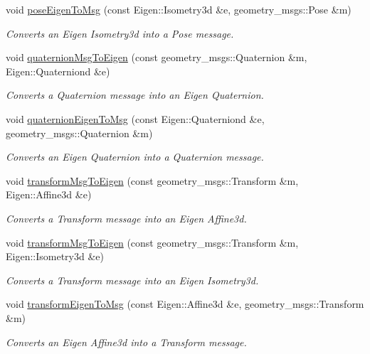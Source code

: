 \begin{DoxyCompactItemize}
void \hyperlink{namespacetf_adda234955557076bd46804dec234396d}{pose\-Eigen\-To\-Msg} (const Eigen\-::\-Isometry3d \&e, geometry\-\_\-msgs\-::\-Pose \&m)
\begin{DoxyCompactList}\small\item\em Converts an Eigen Isometry3d into a Pose message. \end{DoxyCompactList}\item 
void \hyperlink{namespacetf_ab7fd3888706bdcc976acffecdf9886be}{quaternion\-Msg\-To\-Eigen} (const geometry\-\_\-msgs\-::\-Quaternion \&m, Eigen\-::\-Quaterniond \&e)
\begin{DoxyCompactList}\small\item\em Converts a Quaternion message into an Eigen Quaternion. \end{DoxyCompactList}\item 
void \hyperlink{namespacetf_a9029fb8e50866ee1c690bbc6729d33b2}{quaternion\-Eigen\-To\-Msg} (const Eigen\-::\-Quaterniond \&e, geometry\-\_\-msgs\-::\-Quaternion \&m)
\begin{DoxyCompactList}\small\item\em Converts an Eigen Quaternion into a Quaternion message. \end{DoxyCompactList}\item 
void \hyperlink{namespacetf_a4323ed345fb25c89de3a297fdc7401a4}{transform\-Msg\-To\-Eigen} (const geometry\-\_\-msgs\-::\-Transform \&m, Eigen\-::\-Affine3d \&e)
\begin{DoxyCompactList}\small\item\em Converts a Transform message into an Eigen Affine3d. \end{DoxyCompactList}\item 
void \hyperlink{namespacetf_a2f3ebfd509762829be66fc0165bfd0e5}{transform\-Msg\-To\-Eigen} (const geometry\-\_\-msgs\-::\-Transform \&m, Eigen\-::\-Isometry3d \&e)
\begin{DoxyCompactList}\small\item\em Converts a Transform message into an Eigen Isometry3d. \end{DoxyCompactList}\item 
void \hyperlink{namespacetf_a59d5d7450e4228ab287acdb232cd714d}{transform\-Eigen\-To\-Msg} (const Eigen\-::\-Affine3d \&e, geometry\-\_\-msgs\-::\-Transform \&m)
\begin{DoxyCompactList}\small\item\em Converts an Eigen Affine3d into a Transform message. \end{DoxyCompactList}\item 

\end{DoxyCompactItemize}
